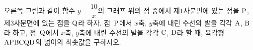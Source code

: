 \noindent\begin{minipage}[t]{0.58\linewidth}\vspace{0pt}\raggedright 오른쪽 그림과 같이 함수 $y=\dfrac{10}{x}$의 그래프 위의 점 중에서 제$1$사분면에 있는 점을 $\mathrm{P}$, 제$3$사분면에 있는 점을 $\mathrm{Q}$라 하자. 점~$\mathrm{P}$에서 $x$축, $y$축에 내린 수선의 발을 각각 $\mathrm{A}$, $\mathrm{B}$라 하고, 점~$\mathrm{Q}$에서 $x$축, $y$축에 내린 수선의 발을 각각 $\mathrm{C}$, $\mathrm{D}$라 할 때, 육각형 $\mathrm{APBCQD}$의 넓이의 최솟값을 구하시오.\end{minipage}\hfill\begin{minipage}[t]{0.4\linewidth}\vspace{0pt}\centering \resizebox{\ifdim\width>\linewidth\linewidth\else\width\fi}{!}{}\end{minipage}\par
